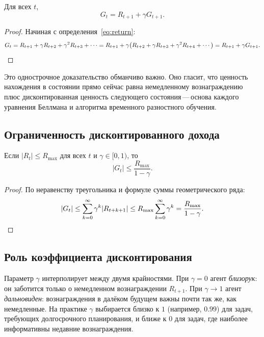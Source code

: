 \begin{theorem}
\label{thm:recursive-return}
Для всех $t$,
\begin{equation}
\label{eq:return-recursion}
G_t = R_{t+1} + \gamma G_{t+1}.
\end{equation}
\end{theorem}

\begin{proof}
Начиная с определения~\eqref{eq:return}:
\[
G_t = R_{t+1} + \gamma R_{t+2} + \gamma^2 R_{t+3} + \cdots
    = R_{t+1} + \gamma \bigl(R_{t+2} + \gamma R_{t+3} + \gamma^2 R_{t+4} + \cdots\bigr)
    = R_{t+1} + \gamma G_{t+1}. \qedhere
\]
\end{proof}

Это однострочное доказательство обманчиво важно. Оно гласит, что ценность нахождения в состоянии прямо сейчас равна немедленному вознаграждению плюс дисконтированная ценность следующего состояния\,---\,основа каждого уравнения Беллмана и алгоритма временного разностного обучения.

\subsection*{Ограниченность дисконтированного дохода}

\begin{proposition}
\label{prop:bounded-return}
Если $|R_t| \le R_{\max}$ для всех $t$ и $\gamma \in [0, 1)$, то
\begin{equation}
\label{eq:bounded-return}
|G_t| \le \frac{R_{\max}}{1 - \gamma}.
\end{equation}
\end{proposition}

\begin{proof}
По неравенству треугольника и формуле суммы геометрического ряда:
\[
|G_t| \le \sum_{k=0}^{\infty} \gamma^k |R_{t+k+1}|
         \le R_{\max} \sum_{k=0}^{\infty} \gamma^k
         = \frac{R_{\max}}{1-\gamma}. \qedhere
\]
\end{proof}

\subsection*{Роль коэффициента дисконтирования}

Параметр $\gamma$ интерполирует между двумя крайностями. При $\gamma = 0$ агент \emph{близорук}: он заботится только о немедленном вознаграждении $R_{t+1}$. При $\gamma \to 1$ агент \emph{дальновиден}: вознаграждения в далёком будущем важны почти так же, как немедленные. На практике $\gamma$ выбирается близко к $1$ (например, $0.99$) для задач, требующих долгосрочного планирования, и ближе к $0$ для задач, где наиболее информативны недавние вознаграждения.

